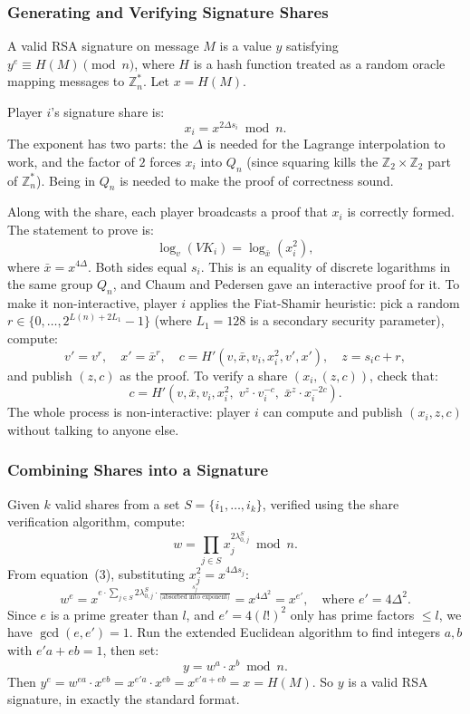 \subsubsection{Generating and Verifying Signature Shares}

A valid RSA signature on message $M$ is a value $y$ satisfying $y^e \equiv H(M)
\pmod{n}$, where $H$ is a hash function treated as a random oracle mapping messages to
$\mathbb{Z}_n^*$. Let $x = H(M)$.

Player $i$'s signature share is:
\[
    x_i = x^{2\Delta s_i} \bmod n. \tag{4}
\]
The exponent has two parts: the $\Delta$ is needed for the Lagrange interpolation to
work, and the factor of $2$ forces $x_i$ into $Q_n$ (since squaring kills the
$\mathbb{Z}_2 \times \mathbb{Z}_2$ part of $\mathbb{Z}_n^*$). Being in $Q_n$ is needed
to make the proof of correctness sound.

Along with the share, each player broadcasts a proof that $x_i$ is correctly formed. The
statement to prove is:
\[
    \log_v(VK_i) = \log_{\bar{x}}(x_i^2),
\]
where $\bar{x} = x^{4\Delta}$. Both sides equal $s_i$. This is an equality of discrete
logarithms in the same group $Q_n$, and Chaum and Pedersen \cite{CP92} gave an
interactive proof for it. To make it non-interactive, player $i$ applies the Fiat-Shamir
heuristic: pick a random $r \in \{0, \ldots, 2^{L(n) + 2L_1} - 1\}$ (where $L_1 = 128$
is a secondary security parameter), compute:
\[
    v' = v^r, \quad x' = \bar{x}^r, \quad c = H'(v, \bar{x}, v_i, x_i^2, v', x'),
    \quad z = s_i c + r,
\]
and publish $(z, c)$ as the proof. To verify a share $(x_i, (z,c))$, check that:
\[
    c = H'(v, \bar{x}, v_i, x_i^2, \; v^z \cdot v_i^{-c}, \; \bar{x}^z \cdot x_i^{-2c}).
\]
The whole process is non-interactive: player $i$ can compute and publish $(x_i, z, c)$
without talking to anyone else.

\subsubsection{Combining Shares into a Signature}

Given $k$ valid shares from a set $S = \{i_1, \ldots, i_k\}$, verified using the share
verification algorithm, compute:
\[
    w = \prod_{j \in S} x_j^{2\lambda_{0,j}^S} \bmod n.
\]
From equation~(3), substituting $x_j^2 = x^{4\Delta s_j}$:
\[
    w^e = x^{e \cdot \sum_{j \in S} 2\lambda_{0,j}^S \cdot \frac{s_j}{\text{(absorbed into exponent)}}}
    = x^{4\Delta^2} = x^{e'}, \quad \text{where } e' = 4\Delta^2.
\]
Since $e$ is a prime greater than $l$, and $e' = 4(l!)^2$ only has prime factors $\leq
l$, we have $\gcd(e, e') = 1$. Run the extended Euclidean algorithm to find integers $a,
b$ with $e'a + eb = 1$, then set:
\[
    y = w^a \cdot x^b \bmod n.
\]
Then $y^e = w^{ea} \cdot x^{eb} = x^{e'a} \cdot x^{eb} = x^{e'a + eb} = x = H(M)$.
So $y$ is a valid RSA signature, in exactly the standard format.

